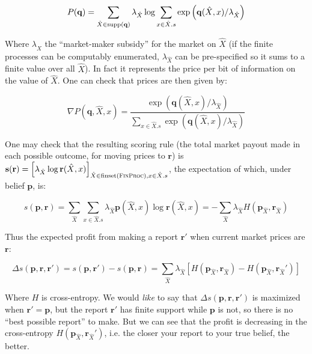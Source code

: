 \documentclass{article}
\begin{document}
\begin{equation*}
    P(\mathbf{q}) = \sum_{\hat{X}\in \operatorname{supp}\left(\mathbf{q}\right)}{\lambda_{\hat{X}}\log\sum_{x\in\hat{X}.s}{\exp\left(\mathbf{q}(\hat{X}, x)/\lambda_{\hat{X}}\right)}}
\end{equation*}

Where $\lambda_{\hat{X}}$ the ``market-maker subsidy'' for the market on $\hat{X}$ (if the finite processes can be computably enumerated, $\lambda_{\hat{X}}$ can be pre-specified so it sums to a finite value over all $\hat{X}$). In fact it represents the price per bit of information on the value of $\hat{X}$. One can check that prices are then given by:

\begin{equation*}
    \nabla P(\mathbf{q}, \hat{X}, x) = \frac{\exp\left(\mathbf{q}(\hat{X}, x)/\lambda_{\hat{X}}\right)}{\sum_{x\in\hat{X}.s}{\exp\left(\mathbf{q}(\hat{X}, x)/\lambda_{\hat{X}}\right)}}
\end{equation*}

One may check that the resulting scoring rule (the total market payout made in each possible outcome, for moving prices to $\mathbf{r}$) is $\mathbf{s}(\mathbf{r})=\left[\lambda_{\hat{X}}\log\mathbf{r}(\hat{X}, x)\right]_{\hat{X}\in\finset{\FinProc}, x\in\hat{X}.s}$, the expectation of which, under belief $\mathbf{p}$, is:

\begin{equation*}
    s(\mathbf{p}, \mathbf{r})
    =\sum_{\hat{X}}\sum_{x\in \hat{X}.s}\lambda_{\hat{X}}\mathbf{p}(\hat{X}, x)\log\mathbf{r}(\hat{X}, x)=-\sum_{\hat{X}}\lambda_{\hat{X}}H(\mathbf{p}_{\hat{X}}, \mathbf{r}_{\hat{X}})
\end{equation*}

Thus the expected profit from making a report $\mathbf{r'}$ when current market prices are $\mathbf{r}$:

\begin{equation*}
    \Delta s(\mathbf{p}, \mathbf{r}, \mathbf{r}') = s(\mathbf{p}, \mathbf{r}') - s(\mathbf{p}, \mathbf{r}) = \sum_{\hat{X}} \lambda_{\hat{X}}\left[H(\mathbf{p}_{\hat{X}}, \mathbf{r}_{\hat{X}}) - H(\mathbf{p}_{\hat{X}}, \mathbf{r}_{\hat{X}}')\right]
\end{equation*}

Where $H$ is cross-entropy. We would \emph{like} to say that $\Delta s(\mathbf{p}, \mathbf{r}, \mathbf{r}')$ is maximized when $\mathbf{r}'=\mathbf{p}$, but the report $\mathbf{r}'$ has finite support while $\mathbf{p}$ is not, so there is no ``best possible report'' to make. But we can see that the profit is decreasing in the cross-entropy $H(\mathbf{p}_{\hat{X}}, \mathbf{r}_{\hat{X}}')$, i.e. the closer your report to your true belief, the better.
\end{document}
